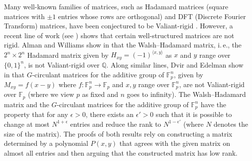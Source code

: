 \documentclass[11pt]{article}
\numberwithin{equation}{section}
\theoremstyle{definition}
\theoremstyle{plain}
\newcommand{\Q}{\mathbb Q}
\newcommand{\ie}{i.\,e.}
\theoremstyle{definition}
\newcommand\F{{\mathbb{F}}}
\renewcommand\Q{{\mathbb{Q}}}
\begin{document}
Many well-known families of matrices, such as Hadamard matrices
(square matrices with $\pm 1$ entries whose rows are orthogonal) and DFT
(Discrete Fourier Transform)  matrices, have been conjectured to be 
Valiant-rigid \cite{survey}.  However, a recent line of work
(see \cite{old_hadamard, CLP}) shows that certain well-structured matrices
are not rigid.  Alman and Williams show in \cite{old_hadamard} that the
Walsh--Hadamard matrix, \ie, the $2^n \times 2^n$ Hadamard matrix given by 
$H_{xy} = (-1)^{\langle x , y \rangle}$ 
as $x$ and $y$ range over $\{ 0,1 \}^n$, is not Valiant-rigid over $\Q$.
Along similar lines, Dvir and Edelman show in \cite{CLP} that 
$G$-circulant matrices for the additive group of
$\F_p^n$, given by $M_{xy} = f(x-y)$ where $f: \F_p^n \rightarrow \F_p$ and $x,y$ range over $\F_p^n$, are not Valiant-rigid over $\F_p$ (where we view $p$ as fixed and $n$ goes to infinity).  The Walsh--Hadamard 
matrix and the $G$-circulant matrices for the additive group of  
$\F_p^n$ have 
the property that for any $\epsilon > 0$, there exists an $\epsilon'>0$ such that it is possible to change at most $N^{1 + \epsilon}$ entries and reduce the rank to $N^{1 - \epsilon'}$ (where $N$ denotes the size of the matrix).  The proofs of both results rely on constructing a matrix determined by a polynomial $P(x,y)$ that agrees with the given matrix on almost all entries and then arguing that the constructed matrix has low rank.   
\end{document}
